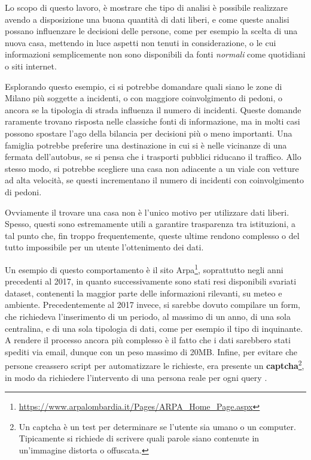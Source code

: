\documentclass[a4paper,12pt]{report}
\newcommand{\quotestyle}[1]{\textit{#1}}
\begin{document}


Lo scopo di questo lavoro, è mostrare che tipo di analisi è possibile realizzare 
avendo a disposizione una buona quantità di dati liberi, e come queste analisi possano 
influenzare le decisioni delle persone, come per esempio la scelta di una nuova casa, 
mettendo in luce aspetti non tenuti in considerazione, o le cui informazioni semplicemente 
non sono disponibili da fonti \quotestyle{normali} come quotidiani o siti internet.

Esplorando questo esempio, ci si potrebbe domandare quali siano le zone 
di Milano più soggette a incidenti, o con maggiore coinvolgimento di pedoni, 
o ancora se la tipologia di strada influenza il numero di incidenti. 
Queste domande raramente trovano risposta nelle classiche fonti di informazione, 
ma in molti casi possono spostare l'ago della bilancia per decisioni più o meno 
importanti.
Una famiglia potrebbe preferire una destinazione in cui si è nelle vicinanze di 
una fermata dell'autobus, se si pensa che i trasporti pubblici riducano 
il traffico. 
Allo stesso modo, si potrebbe scegliere una casa non adiacente 
a un viale con vetture ad alta velocità, se questi incrementano il numero di 
incidenti con coinvolgimento di pedoni.

Ovviamente il trovare una casa non è l'unico motivo per utilizzare dati liberi. 
Spesso, questi sono estremamente utili a garantire trasparenza tra istituzioni, 
a tal punto che, fin troppo frequentemente, queste ultime rendono complesso o 
del tutto impossibile per un utente l'ottenimento dei dati.

Un esempio di questo comportamento è il sito 
Arpa\footnote{\url{https://www.arpalombardia.it/Pages/ARPA_Home_Page.aspx}}, 
soprattutto negli anni precedenti al 2017, in quanto successivamente
sono stati resi disponibili svariati dataset, contenenti la maggior parte delle 
informazioni rilevanti, su meteo e ambiente.
Precedentemente al 2017 invece, si sarebbe dovuto compilare un form, che 
richiedeva l'inserimento di un periodo, al massimo di un anno, di una sola 
centralina, e di una sola tipologia di dati, come per esempio il tipo di inquinante. 
A rendere il processo ancora più complesso è il fatto che i dati sarebbero stati 
spediti via email, dunque con un peso massimo di 20MB.
Infine, per evitare che persone creassero script per automatizzare le richieste, 
era presente un \textbf{captcha}\footnote{Un captcha è un test per determinare se l'utente 
sia umano o un computer. Tipicamente si richiede di scrivere quali parole siano 
contenute in un'immagine distorta o offuscata.}, in modo da richiedere l'intervento 
di una persona reale per ogni query \cite{TRENTINI:1}.
\end{document}
